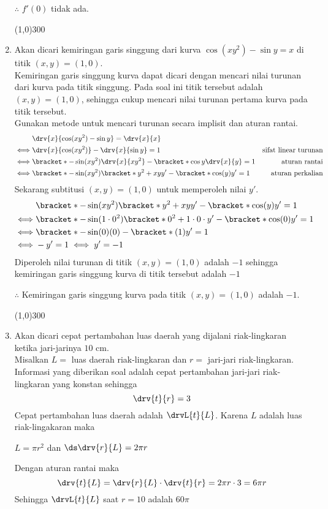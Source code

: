 \begin{enumerate}[leftmargin=*, label={\arabic*}.]
$\therefore$ $f'(0)$ tidak ada.
\begin{center}
    \line(1,0){300}
\end{center}
\item Akan dicari kemiringan garis singgung dari kurva $\cos (xy^{2})-\sin y = x$ di 
titik $(x,y) = (1,0)$.\\
Kemiringan garis singgung kurva dapat dicari dengan mencari nilai turunan dari kurva 
pada titik singgung. Pada soal ini titik tersebut adalah $(x,y) = (1,0)$, sehingga 
cukup mencari nilai turunan pertama kurva pada titik tersebut.\\
Gunakan metode untuk mencari turunan secara implisit dan aturan rantai.
\begin{align*}
    &\drv{x}{\cos (xy^{2})-\sin y} = \drv{x}{x}\\
    \iff &\drv{x}{\cos (xy^{2})} - \drv{x}{\sin y} = 1
    &\text{sifat linear turunan}\\
    \iff &\bracket*{-\sin(xy^{2})\drv{x}{xy^{2}}}
    -\bracket*{\cos y \drv{x}{y}} = 1
    &\text{aturan rantai}\\
    \iff &\bracket*{-\sin (xy^{2})\bracket*{y^{2}+xyy'}} 
    -\bracket*{\cos (y) y'} = 1
    &\text{aturan perkalian}
\end{align*}
Sekarang subtitusi $(x,y)=(1,0)$ untuk memperoleh nilai $y'$.
\begin{align*}
    &\bracket*{-\sin (xy^{2})\bracket*{y^{2}+xyy'}} - \bracket*{\cos (y) y'} = 1\\
    \iff &\bracket*{-\sin (1\cdot 0^{2})\bracket*{0^{2}+1\cdot 0\cdot y'}} - \bracket*{\cos (0) y'} = 1\\
    \iff &\bracket*{-\sin(0)(0)} - \bracket*{(1)y'} = 1\\
    \iff &-y' = 1 \iff y'=-1
\end{align*}
Diperoleh nilai turunan di titik $(x,y) = (1,0)$ adalah $-1$ sehingga kemiringan 
garis singgung kurva di titik tersebut adalah $-1$

$\therefore$ Kemiringan garis singgung kurva pada titik $(x,y) = (1,0)$ adalah $-1$.
\begin{center}
    \line(1,0){300}
\end{center}

\item Akan dicari cepat pertambahan luas daerah yang dijalani riak-lingkaran ketika 
jari-jarinya $10$ cm.\\
Misalkan $L=$ luas daerah riak-lingkaran dan $r=$ jari-jari riak-lingkaran.\\
Informasi yang diberikan soal adalah cepat pertambahan jari-jari riak-lingkaran yang 
konstan sehingga 
\[\drv{t}{r} = 3\]
Cepat pertambahan luas daerah adalah $\drvL{t}{L}$. Karena $L$ adalah luas 
riak-lingakaran maka 
\begin{center}
    $L = \pi r^{2}$ dan $\ds \drv{r}{L} = 2\pi r$
\end{center}
Dengan aturan rantai maka
\[
\drv{t}{L} = \drv{r}{L}\cdot\drv{t}{r} = 2\pi r \cdot 3 = 6\pi r
\]
Sehingga $\drvL{t}{L}$ saat $r=10$ adalah $60\pi$


\end{enumerate}
